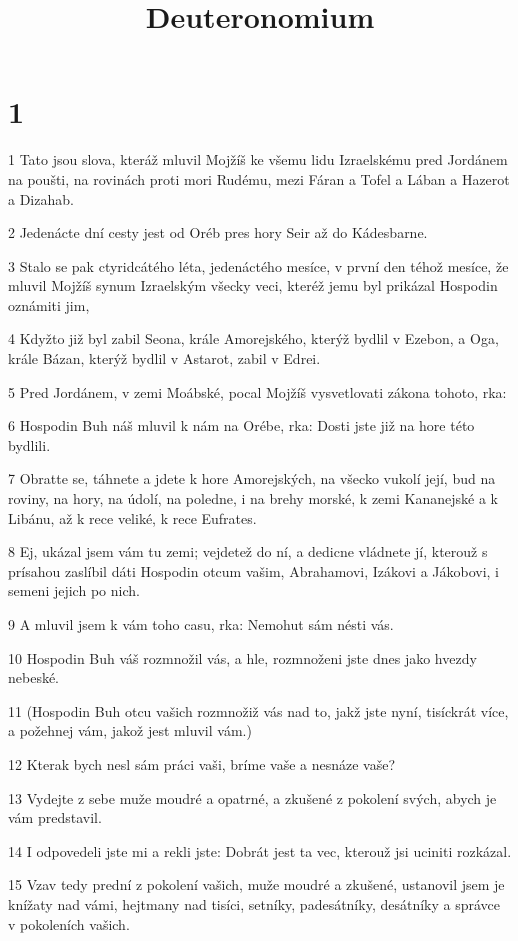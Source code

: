 

\title{Deuteronomium}

\chapter{1}

\par 1 Tato jsou slova, kteráž mluvil Mojžíš ke všemu lidu Izraelskému pred Jordánem na poušti, na rovinách proti mori Rudému, mezi Fáran a Tofel a Lában a Hazerot a Dizahab.
\par 2 Jedenácte dní cesty jest od Oréb pres hory Seir až do Kádesbarne.
\par 3 Stalo se pak ctyridcátého léta, jedenáctého mesíce, v první den téhož mesíce, že mluvil Mojžíš synum Izraelským všecky veci, kteréž jemu byl prikázal Hospodin oznámiti jim,
\par 4 Kdyžto již byl zabil Seona, krále Amorejského, kterýž bydlil v Ezebon, a Oga, krále Bázan, kterýž bydlil v Astarot, zabil v Edrei.
\par 5 Pred Jordánem, v zemi Moábské, pocal Mojžíš vysvetlovati zákona tohoto, rka:
\par 6 Hospodin Buh náš mluvil k nám na Orébe, rka: Dosti jste již na hore této bydlili.
\par 7 Obratte se, táhnete a jdete k hore Amorejských, na všecko vukolí její, bud na roviny, na hory, na údolí, na poledne, i na brehy morské, k zemi Kananejské a k Libánu, až k rece veliké, k rece Eufrates.
\par 8 Ej, ukázal jsem vám tu zemi; vejdetež do ní, a dedicne vládnete jí, kterouž s prísahou zaslíbil dáti Hospodin otcum vašim, Abrahamovi, Izákovi a Jákobovi, i semeni jejich po nich.
\par 9 A mluvil jsem k vám toho casu, rka: Nemohut sám nésti vás.
\par 10 Hospodin Buh váš rozmnožil vás, a hle, rozmnoženi jste dnes jako hvezdy nebeské.
\par 11 (Hospodin Buh otcu vašich rozmnožiž vás nad to, jakž jste nyní, tisíckrát více, a požehnej vám, jakož jest mluvil vám.)
\par 12 Kterak bych nesl sám práci vaši, bríme vaše a nesnáze vaše?
\par 13 Vydejte z sebe muže moudré a opatrné, a zkušené z pokolení svých, abych je vám predstavil.
\par 14 I odpovedeli jste mi a rekli jste: Dobrát jest ta vec, kterouž jsi uciniti rozkázal.
\par 15 Vzav tedy prední z pokolení vašich, muže moudré a zkušené, ustanovil jsem je knížaty nad vámi, hejtmany nad tisíci, setníky, padesátníky, desátníky a správce v pokoleních vašich.

